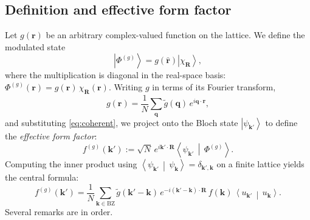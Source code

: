 \documentclass[aps,prb,onecolumn,nofootinbib,superscriptaddress]{revtex4-2}
\newcommand{\mbf}[1]{\mathbf{#1}}
\newcommand{\ket}[1]{\left|#1\right\rangle}
\newcommand{\braket}[2]{\left\langle#1\,\middle|\,#2\right\rangle}
\begin{document}
\subsection{Definition and effective form factor}

Let $g(\mbf{r})$ be an arbitrary complex-valued function on the lattice. We define the modulated state
\begin{equation}\label{eq:modulated}
\ket{\Phi^{(g)}} = g(\hat{\mbf{r}}) \ket{\chi_{\mbf{R}}},
\end{equation}
where the multiplication is diagonal in the real-space basis:
$\Phi^{(g)}(\mbf{r}) = g(\mbf{r})\,\chi_{\mbf{R}}(\mbf{r}).$
Writing $g$ in terms of its Fourier transform,
\begin{equation}\label{eq:g_fourier}
g(\mbf{r}) = \frac{1}{N}\sum_{\mbf{q}} \tilde{g}(\mbf{q})\, e^{i\mbf{q}\cdot\mbf{r}},
\end{equation}
and substituting \eqref{eq:coherent}, we project onto the Bloch state $\ket{\psi_{\mbf{k}'}}$ to define the \emph{effective form factor}:
\begin{equation}\label{eq:feff_def}
f^{(g)}(\mbf{k}') := \sqrt{N}\, e^{i\mbf{k}'\cdot\mbf{R}}\braket{\psi_{\mbf{k}'}}{\Phi^{(g)}}.
\end{equation}
Computing the inner product using $\braket{\psi_{\mbf{k}'}}{\psi_{\mbf{k}}} = \delta_{\mbf{k}',\mbf{k}}$ on a finite lattice yields the central formula:
\begin{equation}\label{eq:feff_general}
\boxed{f^{(g)}(\mbf{k}') = \frac{1}{N}\sum_{\mbf{k} \in \mathrm{BZ}} \tilde{g}(\mbf{k}'-\mbf{k})\, e^{-i(\mbf{k}'-\mbf{k})\cdot\mbf{R}}\, f(\mbf{k})\, \braket{u_{\mbf{k}'}}{u_{\mbf{k}}}.}
\end{equation}
Several remarks are in order.
\end{document}
